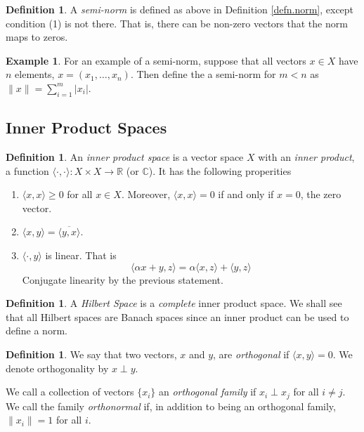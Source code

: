 \documentclass[12pt]{article}
\theoremstyle{plain}
\theoremstyle{definition}
\newtheorem{defn}[thm]{Definition}
\newtheorem{ex}[thm]{Example}
\theoremstyle{remark}
\begin{document}
\begin{defn}
A \emph{semi-norm} is defined as above in Definition \ref{defn.norm}, except condition (1) is not there. That is, there can be non-zero vectors that the norm maps to zeros.
\end{defn}
\begin{ex}
For an example of a semi-norm, suppose that all vectors $x\in X$ have $n$ elements, $x=(x_1,\ldots,x_n)$. Then define the a semi-norm for $m<n$ as $\lVert x\rVert = \sum_{i=1}^m |x_i|$.
\end{ex}

\subsection{Inner Product Spaces}

\begin{defn}
An \emph{inner product space} is a vector space $X$ with an \emph{inner product}, a function $\langle\cdot,\cdot\rangle:X\times X\rightarrow\mathbb{R}$ (or $\mathbb{C}$). It has the following properities
\begin{enumerate}
\item $\langle x,x\rangle \geq 0$ for all $x\in X$. Moreover, $\langle x,x\rangle=0$ if and only if $x=0$, the zero vector.
\item $\langle x,y\rangle= \overline{\langle y,x\rangle}$.
\item $\langle \cdot,y\rangle$ is linear. That is 
\[
    \langle \alpha x + y,z\rangle = 
    \alpha \langle x ,z\rangle + \langle y,z\rangle
\]
Conjugate linearity by the previous statement.
\end{enumerate}
\end{defn}

\begin{defn}
A \emph{Hilbert Space} is a \emph{complete} inner product space. We shall see that all Hilbert spaces are Banach spaces since an inner product can be used to define a norm.
\end{defn}

\begin{defn}
We say that two vectors, $x$ and $y$, are \emph{orthogonal} if $\langle x,y\rangle =0$. We denote orthogonality by $x\perp y$.

We call a collection of vectors $\{x_i\}$ an \emph{orthogonal family} if $x_i\perp x_j$ for all $i\neq j$. We call the family \emph{orthonormal} if, in addition to being an orthogonal family, $\lVert x_i\rVert=1$ for all $i$. 
\end{defn}
\end{document}

